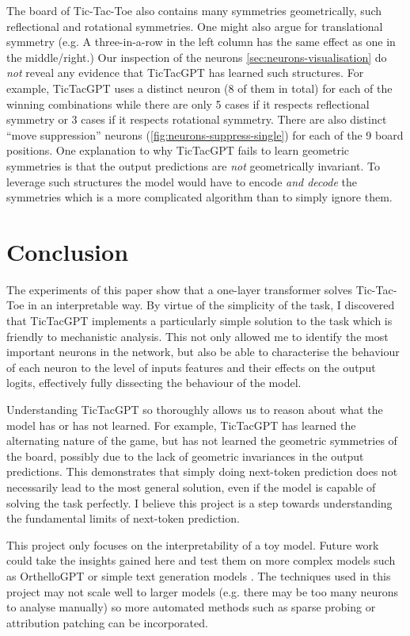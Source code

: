 \documentclass{article}
\newcommand{\ttgpt}{TicTacGPT\xspace}
\newcommand{\ttt}{Tic-Tac-Toe\xspace}
\begin{document}
The board of \ttt also contains many symmetries geometrically, such reflectional and rotational symmetries. One might also argue for translational symmetry (e.g. A three-in-a-row in the left column has the same effect as one in the middle/right.) Our inspection of the neurons \cref{sec:neurons-visualisation} do \emph{not} reveal any evidence that \ttgpt has learned such structures. For example, \ttgpt uses a distinct neuron (8 of them in total) for each of the winning combinations while there are only 5 cases if it respects reflectional symmetry or 3 cases if it respects rotational symmetry. There are also distinct ``move suppression'' neurons (\cref{fig:neurons-suppress-single}) for each of the 9 board positions. One explanation to why \ttgpt fails to learn geometric symmetries is that the output predictions are \emph{not} geometrically invariant. To leverage such structures the model would have to encode \emph{and decode} the symmetries which is a more complicated algorithm than to simply ignore them.

\section{Conclusion}

The experiments of this paper show that a one-layer transformer solves \ttt in an interpretable way. By virtue of the simplicity of the task, I discovered that \ttgpt implements a particularly simple solution to the task which is friendly to mechanistic analysis. This not only allowed me to identify the most important neurons in the network, but also be able to characterise the behaviour of each neuron to the level of inputs features and their effects on the output logits, effectively fully dissecting the behaviour of the model.

Understanding \ttgpt so thoroughly allows us to reason about what the model has or has not learned. For example, \ttgpt has learned the alternating nature of the game, but has not learned the geometric symmetries of the board, possibly due to the lack of geometric invariances in the output predictions. This demonstrates that simply doing next-token prediction does not necessarily lead to the most general solution, even if the model is capable of solving the task perfectly. I believe this project is a step towards understanding the fundamental limits of next-token prediction.

This project only focuses on the interpretability of a toy model. Future work could take the insights gained here and test them on more complex models such as OrthelloGPT \cite{orthello-gpt} or simple text generation models \cite{olsson2022context}. The techniques used in this project may not scale well to larger models (e.g. there may be too many neurons to analyse manually) so more automated methods such as sparse probing \cite{gurnee2023finding} or attribution patching \cite{nanda2023attribution} can be incorporated.
\end{document}
